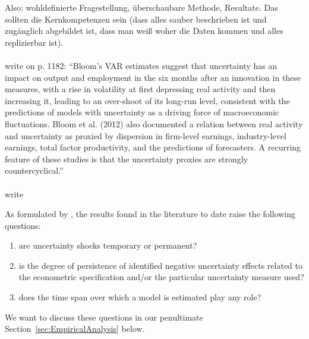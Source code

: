 \documentclass[a4paper,12pt,oneside,pointednumbers,bibtotoc,bigheadings,liststotoc]{scrbook}
\begin{document}
Also: wohldefinierte Fragestellung, überschaubare Methode, Resultate. Das sollten die Kernkompetenzen sein (dass alles sauber beschrieben ist und zugänglich abgebildet ist, dass man weiß woher die Daten kommen und alles replizierbar ist).
\\
\\
\citet{juradoetal:15} write on p. 1182: ``Bloom's VAR estimates suggest that uncertainty has an impact on output and employment in the six months after an innovation in these measures, with a rise in volatility at first depressing real activity and then increasing it, leading to an over-shoot of its long-run level, consistent with the predictions of models with uncertainty as a driving force of macroeconomic fluctuations. Bloom et al. (2012) also documented a relation between real activity and uncertainty as proxied by dispersion in firm-level earnings, industry-level earnings, total factor productivity, and the predictions of forecasters. A recurring feature of these studies is that the uncertainty proxies are strongly countercyclical.''
\\
\\
\citet{orlikandveldkamp:14} write

As formulated by \citet[p. 24]{bontempietal:16}, the results found in the literature to date raise the following questions:
\begin{enumerate}
	\item are uncertainty shocks temporary or permanent?
	\item is the degree of persistence of identified negative uncertainty effects related to the econometric specification and/or the particular uncertainty measure used?
	\item does the time span over which a model is estimated play any role?
\end{enumerate}

We want to discuss these questions in our penultimate Section~\ref{sec:EmpiricalAnalysis} below.
\end{document}
